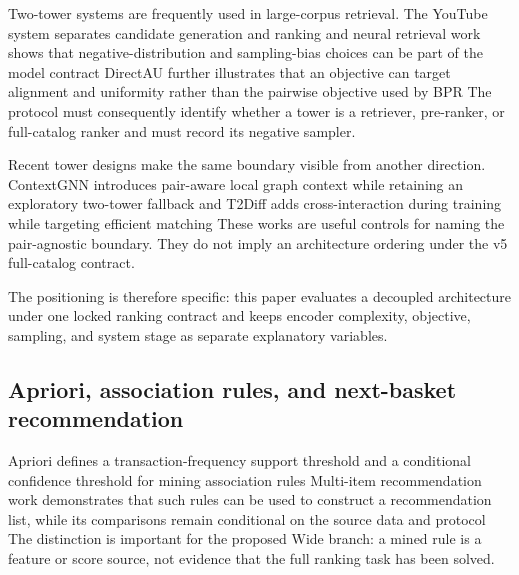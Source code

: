 \documentclass[10pt,a4paper]{article}
\begin{document}
Two-tower systems are frequently used in large-corpus retrieval. The YouTube
system separates candidate generation and ranking
\cite{covington2016_youtube} %
and neural retrieval work shows that negative-distribution and sampling-bias
choices can be part of the model contract
\cite{yi2019_ndr} %
DirectAU further illustrates that an objective can target alignment and
uniformity rather than the pairwise objective used by BPR
\cite{wang2022_directau} %
The protocol must consequently identify whether a tower is a retriever,
pre-ranker, or full-catalog ranker and must record its negative sampler.

Recent tower designs make the same boundary visible from another direction.
ContextGNN introduces pair-aware local graph context while retaining an
exploratory two-tower fallback
\cite{yuan2025_contextgnn} %
and T2Diff adds cross-interaction during training while targeting efficient
matching
\cite{wang2025_t2diff} %
These works are useful controls for naming the pair-agnostic boundary. They do
not imply an architecture ordering under the v5 full-catalog contract.

The positioning is therefore specific: this paper evaluates a decoupled
architecture under one locked ranking contract and keeps encoder complexity,
objective, sampling, and system stage as separate explanatory variables.

\subsection{Apriori, association rules, and next-basket recommendation}

Apriori defines a transaction-frequency support threshold and a conditional
confidence threshold for mining association rules
\cite{agrawal1994_apriori} %
Multi-item recommendation work demonstrates that such rules can be used to
construct a recommendation list, while its comparisons remain conditional on
the source data and protocol
\cite{ghoshal2014_multi_item_rules} %
The distinction is important for the proposed Wide branch: a mined rule is a
feature or score source, not evidence that the full ranking task has been
solved.
\end{document}
